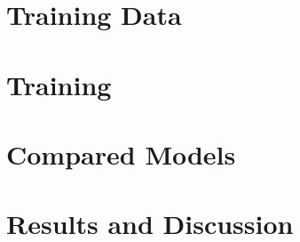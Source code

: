 \section{Training Data}
\label{sec:phaser_training_data}

\section{Training}
\label{sec:phaser_training}

\section{Compared Models}
\label{sec:phaser_models}

\section{Results and Discussion}
\label{sec:phaser_results}

